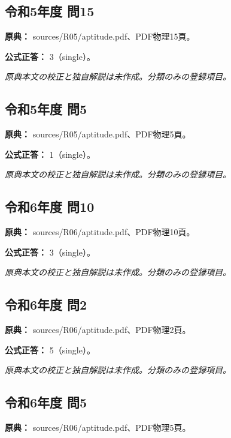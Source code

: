 \subsection{令和5年度 問15}
\label{q:r05-reg-apt-15}

\noindent\textbf{原典：} sources/R05/aptitude.pdf、PDF物理15頁。

\textbf{公式正答：} 3（single）。

\par\textit{原典本文の校正と独自解説は未作成。分類のみの登録項目。}

\subsection{令和5年度 問5}
\label{q:r05-reg-apt-05}

\noindent\textbf{原典：} sources/R05/aptitude.pdf、PDF物理5頁。

\textbf{公式正答：} 1（single）。

\par\textit{原典本文の校正と独自解説は未作成。分類のみの登録項目。}

\subsection{令和6年度 問10}
\label{q:r06-reg-apt-10}

\noindent\textbf{原典：} sources/R06/aptitude.pdf、PDF物理10頁。

\textbf{公式正答：} 3（single）。

\par\textit{原典本文の校正と独自解説は未作成。分類のみの登録項目。}

\subsection{令和6年度 問2}
\label{q:r06-reg-apt-02}

\noindent\textbf{原典：} sources/R06/aptitude.pdf、PDF物理2頁。

\textbf{公式正答：} 5（single）。

\par\textit{原典本文の校正と独自解説は未作成。分類のみの登録項目。}

\subsection{令和6年度 問5}
\label{q:r06-reg-apt-05}

\noindent\textbf{原典：} sources/R06/aptitude.pdf、PDF物理5頁。

